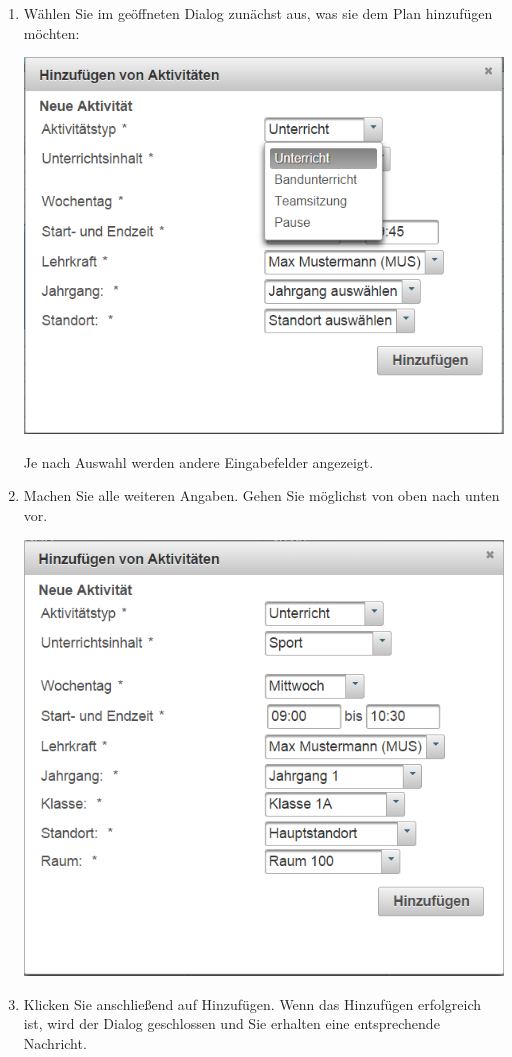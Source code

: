 \documentclass[fontsize=12pt]{scrartcl}
\begin{document}
\begin{enumerate}
\item Wählen Sie im geöffneten Dialog zunächst aus, was sie dem Plan hinzufügen möchten: \medskip\\
	\begin{minipage}[t]{\linewidth}
            \includegraphics[width=.8\linewidth]{images/addActivity.png}
    \end{minipage} 
    \medskip
    Je nach Auswahl werden andere Eingabefelder angezeigt.
    \clearpage
\item Machen Sie alle weiteren Angaben. Gehen Sie möglichst von oben nach unten vor.\medskip\\
	\begin{minipage}[t]{\linewidth}
            \includegraphics[width=.8\linewidth]{images/addActivity2.png}
    \end{minipage} 
    \medskip
\item Klicken Sie anschließend auf Hinzufügen. Wenn das Hinzufügen erfolgreich ist, wird der Dialog geschlossen und Sie erhalten eine entsprechende Nachricht. %
\end{enumerate}
\end{document}
